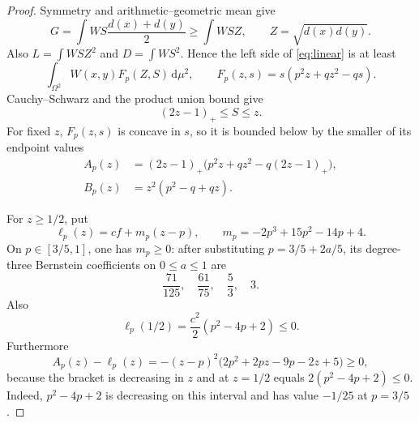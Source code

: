 \documentclass[11pt]{article}
\newcommand{\dd}{\,\mathrm d}
\begin{document}
\begin{proof}
Symmetry and arithmetic--geometric mean give
\[
 G=\int WS\frac{d(x)+d(y)}2\geq\int WSZ,
 \qquad Z=\sqrt{d(x)d(y)}.
\]
Also $L=\int WSZ^2$ and $D=\int WS^2$.  Hence the left side of
\eqref{eq:linear} is at least
\begin{equation}
 \int_{\Omega^2}W(x,y)F_p(Z,S)\dd\mu^2,
 \qquad
 F_p(z,s)=s(p^2z+qz^2-qs).
 \label{eq:F}
\end{equation}
Cauchy--Schwarz and the product union bound give
\[
 (2z-1)_+\leq S\leq z.
\]
For fixed $z$, $F_p(z,s)$ is concave in $s$, so it is bounded below by
the smaller of its endpoint values
\begin{align*}
 A_p(z)&=(2z-1)_+
 \bigl(p^2z+qz^2-q(2z-1)_+\bigr),\\
 B_p(z)&=z^2(p^2-q+qz).
\end{align*}

For $z\geq1/2$, put
\[
 \ell_p(z)=cf+m_p(z-p),
 \qquad m_p=-2p^3+15p^2-14p+4.
\]
On $p\in[3/5,1]$, one has $m_p\geq0$: after substituting
$p=3/5+2a/5$, its degree-three Bernstein coefficients on
$0\leq a\leq1$ are
\[
 \frac{71}{125},\quad \frac{61}{75},\quad \frac53,\quad 3.
\]
Also
\[
 \ell_p(1/2)=\frac{c^2}{2}(p^2-4p+2)\leq0.
\]
Furthermore
\[
 A_p(z)-\ell_p(z)
 =-(z-p)^2\bigl(2p^2+2pz-9p-2z+5\bigr)\geq0,
\]
because the bracket is decreasing in $z$ and at $z=1/2$ equals
$2(p^2-4p+2)\leq0$.  Indeed, $p^2-4p+2$ is decreasing on this
interval and has value $-1/25$ at $p=3/5$.


\end{proof}
\end{document}
